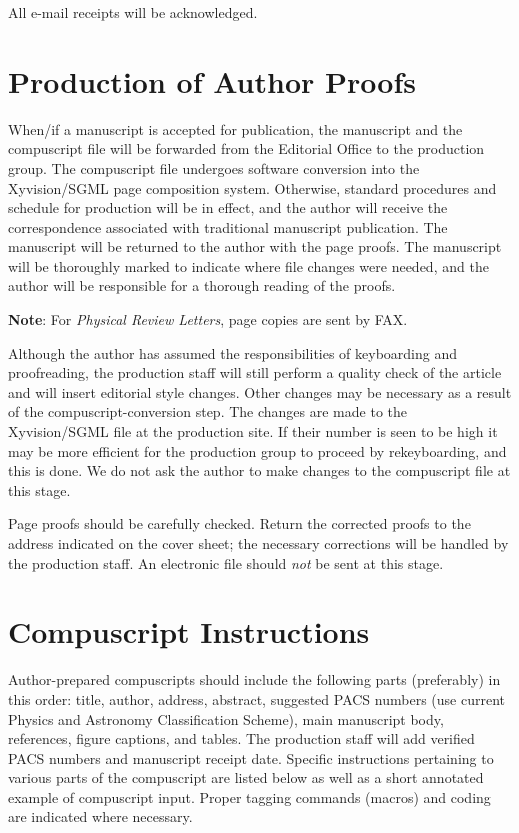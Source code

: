 All e-mail receipts will be acknowledged. 

\section{Production of Author Proofs}
\label{sec:process}

When/if a manuscript is accepted for publication, the manuscript and
the compuscript file will be forwarded from the Editorial Office to
the production group. The compuscript file undergoes software
conversion into the Xyvision/SGML page composition system. Otherwise,
standard procedures and schedule for production will be in effect, and
the author will receive the correspondence associated with traditional
manuscript publication. The manuscript will be returned to the author
with the page proofs.  The manuscript will be thoroughly marked to
indicate where file changes were needed, and the author will be
responsible for a thorough reading of the proofs.

{\bf Note}: For {\em Physical Review Letters}, page copies are sent by FAX.

Although the author has assumed the responsibilities of keyboarding
and proofreading, the production staff will still perform a quality
check of the article and will insert editorial style changes. Other
changes may be necessary as a result of the compuscript-conversion
step. The changes are made to the Xyvision/SGML file at the production
site. If their number is seen to be high it may be more efficient for the
production group to proceed by rekeyboarding, and this is
done. We do not ask the author to make changes to the compuscript file
at this stage. 

Page proofs should be carefully checked.  Return the corrected proofs
to the address indicated on the cover sheet; the necessary corrections
will be handled by the production staff. An electronic file should
{\em not\/} be sent at this stage.

\section{Compuscript Instructions}
\label{sec:instruct}

Author-prepared compuscripts should include the following parts
(preferably) in this
order:  title, author, address, abstract, suggested PACS numbers (use
current Physics and Astronomy Classification Scheme), main manuscript body,
references, figure captions, and tables.  The production staff will add
verified PACS numbers and manuscript receipt date. Specific instructions
pertaining to various parts of the compuscript are listed below as well as
a short annotated example of compuscript input.  Proper tagging
commands (macros) and coding are indicated where necessary.

